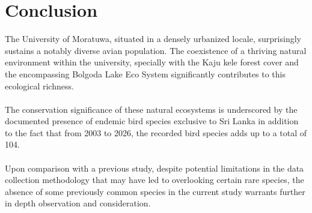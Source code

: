 \chapter{Conclusion}

The University of Moratuwa, situated in a densely urbanized locale, surprisingly sustains a notably diverse avian population. The coexistence of a thriving natural environment within the university, specially with the Kaju kele forest cover and the encompassing Bolgoda Lake Eco System significantly contributes to this ecological richness.
\\\\
The conservation significance of these natural ecosystems is underscored by the documented presence of endemic bird species exclusive to Sri Lanka in addition to the fact that from 2003 to 2026, the recorded bird species adds up to a total of 104.
\\\\
Upon comparison with a previous study, despite potential limitations in the data collection methodology that may have led to overlooking certain rare species, the absence of some previously common species in the current study warrants further in depth observation and consideration. 